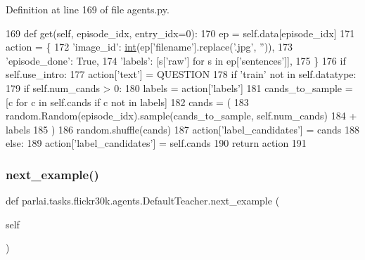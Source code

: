 Definition at line 169 of file agents.\+py.


\begin{DoxyCode}
169     \textcolor{keyword}{def }get(self, episode\_idx, entry\_idx=0):
170         ep = self.data[episode\_idx]
171         action = \{
172             \textcolor{stringliteral}{'image\_id'}: \hyperlink{namespacelanguage__model_1_1eval__ppl_a7d12ee00479673c5c8d1f6d01faa272a}{int}(ep[\textcolor{stringliteral}{'filename'}].replace(\textcolor{stringliteral}{'.jpg'}, \textcolor{stringliteral}{''})),
173             \textcolor{stringliteral}{'episode\_done'}: \textcolor{keyword}{True},
174             \textcolor{stringliteral}{'labels'}: [s[\textcolor{stringliteral}{'raw'}] \textcolor{keywordflow}{for} s \textcolor{keywordflow}{in} ep[\textcolor{stringliteral}{'sentences'}]],
175         \}
176         \textcolor{keywordflow}{if} self.use\_intro:
177             action[\textcolor{stringliteral}{'text'}] = QUESTION
178         \textcolor{keywordflow}{if} \textcolor{stringliteral}{'train'} \textcolor{keywordflow}{not} \textcolor{keywordflow}{in} self.datatype:
179             \textcolor{keywordflow}{if} self.num\_cands > 0:
180                 labels = action[\textcolor{stringliteral}{'labels'}]
181                 cands\_to\_sample = [c \textcolor{keywordflow}{for} c \textcolor{keywordflow}{in} self.cands \textcolor{keywordflow}{if} c \textcolor{keywordflow}{not} \textcolor{keywordflow}{in} labels]
182                 cands = (
183                     random.Random(episode\_idx).sample(cands\_to\_sample, self.num\_cands)
184                     + labels
185                 )
186                 random.shuffle(cands)
187                 action[\textcolor{stringliteral}{'label\_candidates'}] = cands
188             \textcolor{keywordflow}{else}:
189                 action[\textcolor{stringliteral}{'label\_candidates'}] = self.cands
190         \textcolor{keywordflow}{return} action
191 
\end{DoxyCode}
\mbox{\label{classparlai_1_1tasks_1_1flickr30k_1_1agents_1_1DefaultTeacher_ada88912036e5d75c2f2a5bff298b1d88}} 
\subsubsection{\texorpdfstring{next\+\_\+example()}{next\_example()}}
{\footnotesize\ttfamily def parlai.\+tasks.\+flickr30k.\+agents.\+Default\+Teacher.\+next\+\_\+example (\begin{DoxyParamCaption}\item[{}]{self }\end{DoxyParamCaption})}


